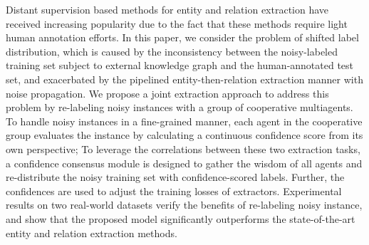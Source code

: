 Distant supervision based methods for entity and relation extraction have received increasing popularity due to the fact that these methods require light human annotation efforts.  In this paper, we consider the problem of shifted label distribution, which is caused by the inconsistency between the noisy-labeled training set subject to external knowledge graph and the human-annotated test set, and exacerbated by the pipelined entity-then-relation extraction manner with noise propagation. We propose a joint extraction approach to address this problem by re-labeling noisy instances with a group of cooperative multiagents. To handle noisy instances in a fine-grained manner, each agent in the cooperative group evaluates the instance by calculating a continuous confidence score from its own perspective; To leverage the correlations between these two extraction tasks, a confidence consensus module is designed to gather the wisdom of all agents and re-distribute the noisy training set with confidence-scored labels.  Further, the confidences are used to adjust the training losses of extractors. Experimental results on two real-world datasets verify the benefits of re-labeling noisy instance, and show that the proposed model significantly outperforms the state-of-the-art entity and relation extraction methods.
